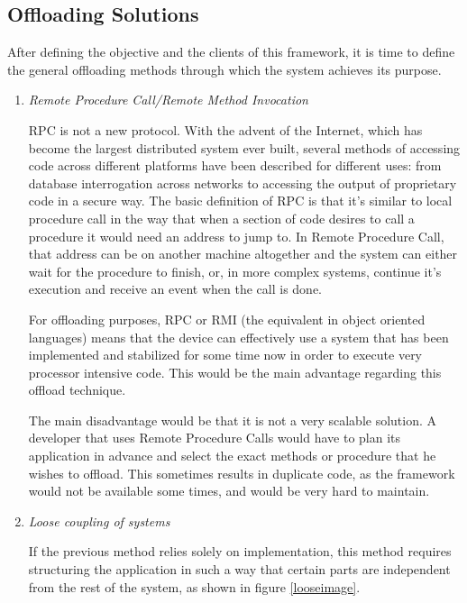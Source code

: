 \documentclass[twoside]{article}
\begin{document}
\begin{multicols}{2}
\subsection{Offloading Solutions}
\label{offloadingsolutions}

After defining the objective and the clients of this framework, it is time to define the general offloading methods through which the system achieves its purpose.

\begin{enumerate}

\item{\emph{Remote Procedure Call/Remote Method Invocation}}

RPC\cite{RPC} is not a new protocol. With the advent of the Internet, which has become the largest distributed system ever built, several methods of accessing code across different platforms have been described for different uses: from database interrogation across networks to accessing the output of proprietary code in a secure way. The basic definition of RPC is that it's similar to local procedure call in the way that when a section of code desires to call a procedure it would need an address to jump to. In Remote Procedure Call, that address can be on another machine altogether and the system can either wait for the procedure to finish, or, in more complex systems, continue it's execution and receive an event when the call is done. 

For offloading purposes, RPC or RMI (the equivalent in object oriented languages) means that the device can effectively use a system that has been implemented and stabilized for some time now in order to execute very processor intensive code. This would be the main advantage regarding this offload technique.

The main disadvantage would be that it is not a very scalable solution. A developer that uses Remote Procedure Calls would have to plan its application in advance and select the exact methods or procedure that he wishes to offload. This sometimes results in duplicate code, as the framework would not be available some times, and would be very hard to maintain.

\item{\emph{Loose coupling of systems}}

If the previous method relies solely on implementation, this method requires structuring the application in such a way that certain parts are independent from the rest of the system, as shown in figure \ref{looseimage}.


\end{enumerate}
\end{multicols}
\end{document}
